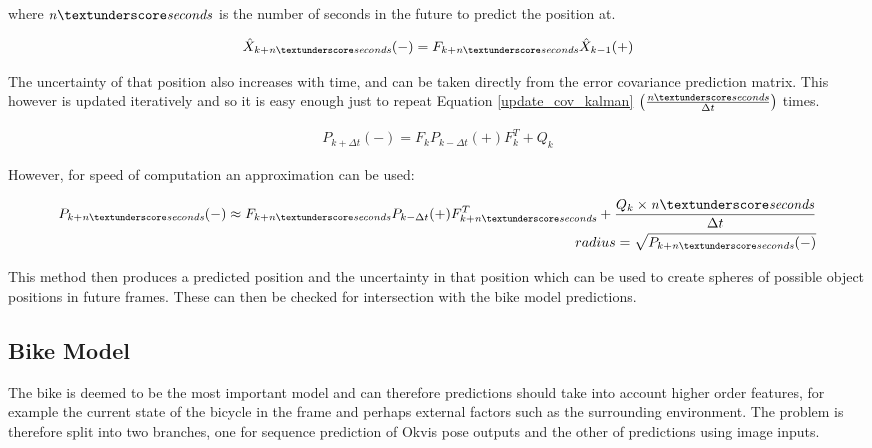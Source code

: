 \documentclass[11pt,twoside]{report}
\begin{document}
where $\mathit{n \textunderscore seconds}$ is the number of seconds in the future to predict the position at.

\begin{equation}
\begin{aligned}
\hat{X}_{k+\mathit{n \textunderscore seconds}}(-) =  F_{k+\mathit{n \textunderscore seconds}} \hat{X}_{k-1}(+)
\end{aligned}
\end{equation}

The uncertainty of that position also increases with time, and can be taken directly from the error covariance prediction matrix. This however is updated iteratively and so it is easy enough just to repeat Equation \ref{update_cov_kalman} $ \big (\frac{\mathit{n \textunderscore seconds}}{\Delta t} \big )$ times.

\begin{equation}
\begin{aligned}
P_{k+ \Delta t}(-) = F_{k} P_{k- \Delta t}(+) F_{k}^{T} + Q_{k}
\end{aligned}
\label{update_cov_kalman}
\end{equation}

However, for speed of computation an approximation can be used:

\begin{equation}
\begin{aligned}
P_{k+ \mathit{n \textunderscore seconds}}(-) \approx F_{k + \mathit{n \textunderscore seconds}} P_{k- \Delta t}(+) F_{k + \mathit{n \textunderscore seconds}}^{T} + \frac{Q_{k} \times \mathit{n \textunderscore seconds}} {\Delta t} \\
radius = \sqrt{P_{k+ \mathit{n \textunderscore seconds}}(-)}
\end{aligned}
\label{cov_kalman_approx}
\end{equation}

This method then produces a predicted position and the uncertainty in that position which can be used to create spheres of possible object positions in future frames. These can then be checked for intersection with the bike model predictions. 



\subsection{Bike Model} \label{bike_model}

The bike is deemed to be the most important model and can therefore predictions should take into account higher order features, for example the current state of the bicycle in the frame and perhaps external factors such as the surrounding environment. The problem is therefore split into two branches, one for sequence prediction of Okvis pose outputs and the other of predictions using image inputs.
\end{document}
